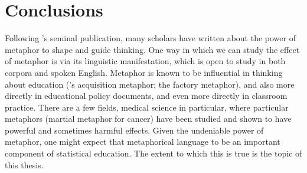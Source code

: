 \section{Conclusions}

Following \citeauthor{lakoff1980}'s seminal publication, many scholars
have written about the power of metaphor to shape and guide thinking.
One way in which we can study the effect of metaphor is via its
linguistic manifestation, which is open to study in both corpora and
spoken English.  Metaphor is known to be influential in thinking about
education (\cite{sfard1998}'s acquisition metaphor; the factory
metaphor), and also more directly in educational policy documents, and
even more directly in classroom practice.  There are a few fields,
medical science in particular, where particular metaphors (martial
metaphor for cancer) have been studied and shown to have powerful and
sometimes harmful effects.  Given the undeniable power of metaphor,
one might expect that metaphorical language to be an important
component of statistical education.  The extent to which this is true
is the topic of this thesis.

